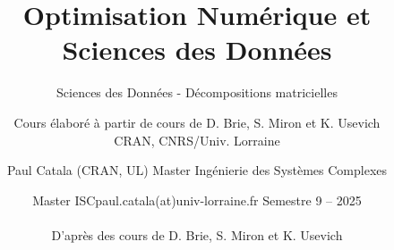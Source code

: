 \documentclass[9pt]{beamer}
\author{Cours élaboré à partir de cours de D. Brie, S. Miron et K. Usevich \\CRAN, CNRS/Univ. Lorraine  }
\title{Optimisation Numérique et Sciences des Données}
\subtitle{Sciences des Données - Décompositions matricielles}
\date{Master ISC}
\author{Paul Catala (CRAN, UL) \hfill Master Ingénierie des Systèmes Complexes}
\date{paul.catala(at)univ-lorraine.fr \hfill Semestre 9 -- 2025 \\ \\ D'après des cours de D. Brie, S. Miron et K. Usevich}
\def\nvar{\mathrm{q}}
\begin{document}


\newcommand{\toclesssection}[1]{
  \setboolean{sectiontoc}{false}
  \section{#1}
  \setboolean{sectiontoc}{true}
}





\makeatletter
\newcommand{\xdashrightarrow}[2][]{\ext@arrow 0359\rightarrowfill@@{#1}{#2}}
\newcommand{\xdashleftarrow}[2][]{\ext@arrow 3095\leftarrowfill@@{#1}{#2}}
\newcommand{\xdashleftrightarrow}[2][]{\ext@arrow 3359\leftrightarrowfill@@{#1}{#2}}
\def\rightarrowfill@@{\arrowfill@@\relax\relbar\rightarrow}
\def\leftarrowfill@@{\arrowfill@@\leftarrow\relbar\relax}
\def\leftrightarrowfill@@{\arrowfill@@\leftarrow\relbar\rightarrow}
\def\arrowfill@@#1#2#3#4{%
  $\m@th\thickmuskip0mu\medmuskip\thickmuskip\thinmuskip\thickmuskip
   \relax#4#1
   \xleaders\hbox{$#4#2$}\hfill
   #3$%
}
\makeatother


\renewcommand{\nvar}{n}

\begin{frame}[t,plain]
\titlepage
\end{frame}
\end{document}
